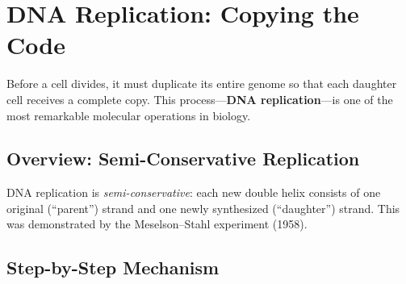 \section{DNA Replication: Copying the Code}
\label{sec:dna-replication}

Before a cell divides, it must duplicate its entire genome so that each daughter cell receives a complete copy. This process---\textbf{DNA replication}---is one of the most remarkable molecular operations in biology.

\subsection{Overview: Semi-Conservative Replication}

DNA replication is \emph{semi-conservative}: each new double helix consists of one original (``parent'') strand and one newly synthesized (``daughter'') strand. This was demonstrated by the Meselson--Stahl experiment (1958).

\subsection{Step-by-Step Mechanism}

